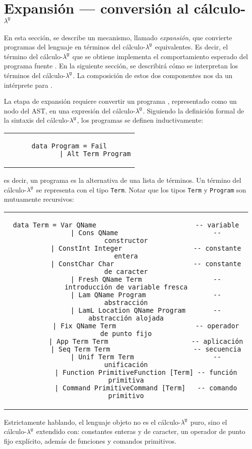 \section{Expansión --- conversión al cálculo-$\lambda^{\mathtt{U}}$}

En esta sección, se describe un mecanismo, llamado {\em expansión},
que convierte programas del lenguaje \nuflo en términos del cálculo-$\lambda^{\mathtt{U}}$ equivalentes.
Es decir, el término del cálculo-$\lambda^{\mathtt{U}}$ que se obtiene
implementa el comportamiento esperado del programa fuente \nuflo.
En la siguiente sección, se describirá cómo se interpretan los términos del
cálculo-$\lambda^{\mathtt{U}}$.
La composición de estos dos componentes nos da un intérprete para \nuflo.
\bigskip

La etapa de expansión requiere convertir un programa \nuflo, representado como un nodo del AST,
en una expresión del cálculo-$\lambda^{\mathtt{U}}$.
Siguiendo la definición formal de la sintaxis del cálculo-$\lambda^{\mathtt{U}}$,
los programas se definen inductivamente:
\begin{center}
\begin{tabular}{c}
\begin{lstlisting}[mathescape=true]
data Program = Fail
             | Alt Term Program
\end{lstlisting}
\end{tabular}
\end{center}
es decir, un programa es la alternativa de una lista de términos.
Un término del cálculo-$\lambda^{\mathtt{U}}$ se representa con el tipo \verb|Term|.
Notar que los tipos \verb|Term| y \verb|Program| son mutuamente recursivos:
\begin{center}
\begin{tabular}{c}
\begin{lstlisting}[mathescape=true]
data Term = Var QName                         -- variable
          | Cons QName                        -- constructor
          | ConstInt Integer                  -- constante entera
          | ConstChar Char                    -- constante de caracter
          | Fresh QName Term                  -- introducción de variable fresca
          | Lam QName Program                 -- abstracción
          | LamL Location QName Program       -- abstracción alojada
          | Fix QName Term                    -- operador de punto fijo
          | App Term Term                     -- aplicación
          | Seq Term Term                     -- secuencia
          | Unif Term Term                    -- unificación
          | Function PrimitiveFunction [Term] -- función primitiva
          | Command PrimitiveCommand [Term]   -- comando primitivo
\end{lstlisting}
\end{tabular}
\end{center}
Estrictamente hablando, el lenguaje objeto no es el cálculo-$\lambda^{\mathtt{U}}$
puro, sino el cálculo-$\lambda^{\mathtt{U}}$ extendido con:
constantes enteras y de caracter,
un operador de punto fijo explícito,
además de funciones y comandos primitivos.
\bigskip


